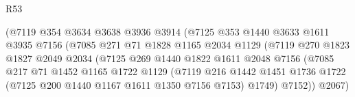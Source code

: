 \begin{lexlean}{R53}
\begin{coremodule}
                                      (@7119
                                        @354
                                        @3634
                                        @3638
                                        @3936
                                        @3914
                                        (@7125
                                          @353
                                          @1440
                                          @3633
                                          @1611
                                          @3935
                                          @7156
                                          (@7085
                                            @271
                                            @71
                                            @1828
                                            @1165
                                            @2034
                                            @1129
                                            (@7119
                                              @270
                                              @1823
                                              @1827
                                              @2049
                                              @2034
                                              (@7125
                                                @269
                                                @1440
                                                @1822
                                                @1611
                                                @2048
                                                @7156
                                                (@7085
                                                  @217
                                                  @71
                                                  @1452
                                                  @1165
                                                  @1722
                                                  @1129
                                                  (@7119
                                                    @216
                                                    @1442
                                                    @1451
                                                    @1736
                                                    @1722
                                                    (@7125 @200 @1440 @1167 @1611 @1350 @7156 @7153)
                                                    @1749)
                                                  @7152))
                                              @2067)

\end{coremodule}
\end{lexlean}
